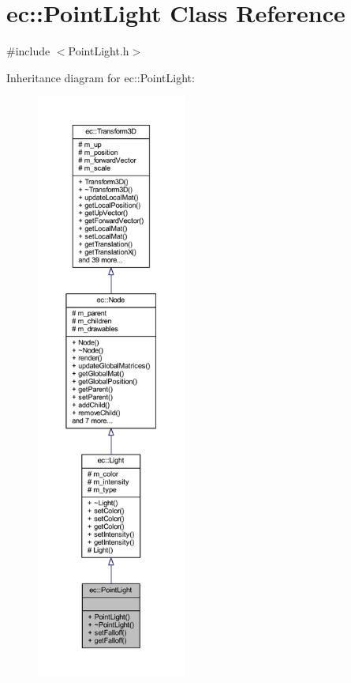\hypertarget{classec_1_1_point_light}{}\section{ec\+:\+:Point\+Light Class Reference}
\label{classec_1_1_point_light}


{\ttfamily \#include $<$Point\+Light.\+h$>$}



Inheritance diagram for ec\+:\+:Point\+Light\+:\nopagebreak
\begin{figure}[H]
\begin{center}
\leavevmode
\includegraphics[height=550pt]{classec_1_1_point_light__inherit__graph}
\end{center}
\end{figure}


